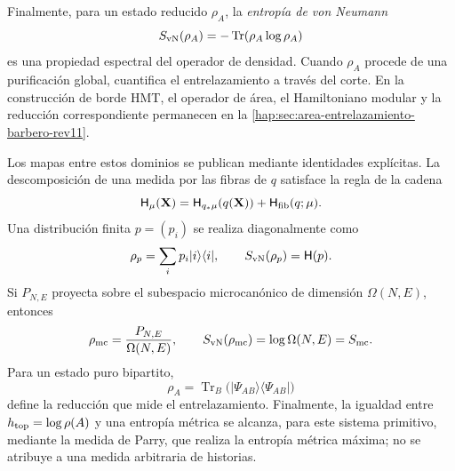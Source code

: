 Finalmente, para un estado reducido \(\rho_A\), la \emph{entropía de von
Neumann}
\[
 S_{\rm vN}(\rho_A)=-\operatorname{Tr}(\rho_A\log\rho_A)
\]
es una propiedad espectral del operador de densidad. Cuando \(\rho_A\)
procede de una purificación global, cuantifica el entrelazamiento a través
del corte. En la construcción de borde HMT, el operador de área, el
Hamiltoniano modular y la reducción correspondiente permanecen en la
\cref{hap:sec:area-entrelazamiento-barbero-rev11}.

Los mapas entre estos dominios se publican mediante identidades explícitas.
La descomposición de una medida por las fibras de \(q\) satisface la regla de
la cadena
\begin{equation}
 \mathsf H_\mu(\mathbf X)
 =\mathsf H_{q_*\mu}(q(\mathbf X))
  +\mathsf H_{\rm fib}(q;\mu).
 \label{eq:cadena-entropia-fibras-rev2}
\end{equation}
Una distribución finita \(p=(p_i)\) se realiza diagonalmente como
\[
 \rho_p=\sum_i p_i|i\rangle\langle i|,
 \qquad S_{\rm vN}(\rho_p)=\mathsf H(p).
\]
Si \(P_{N,E}\) proyecta sobre el subespacio microcanónico de dimensión
\(\Omega(N,E)\), entonces
\[
 \rho_{\rm mc}=\frac{P_{N,E}}{\Omega(N,E)},
 \qquad S_{\rm vN}(\rho_{\rm mc})=\log\Omega(N,E)=S_{\rm mc}.
\]
Para un estado puro bipartito,
\[
 \rho_A=\operatorname{Tr}_B
 \bigl(|\Psi_{AB}\rangle\langle\Psi_{AB}|\bigr)
\]
define la reducción que mide el entrelazamiento. Finalmente, la igualdad entre
\(h_{\rm top}=\log\rho(A)\) y una entropía métrica se alcanza, para este
sistema primitivo, mediante la medida de Parry, que realiza la entropía métrica
máxima; no se atribuye a una medida arbitraria de historias.

